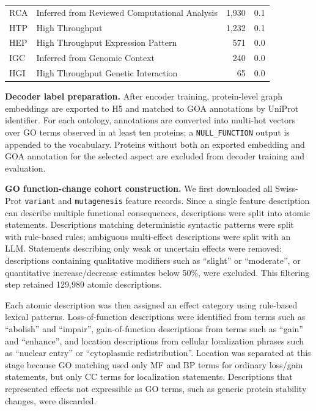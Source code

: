 \documentclass[11pt,a4paper]{article}
\begin{document}
\begin{table}[H]
\begin{tabular}{@{}llrr@{}}
RCA & Inferred from Reviewed Computational Analysis   &   1{,}930 &  0.1 \\
HTP & High Throughput                                 &   1{,}232 &  0.1 \\
HEP & High Throughput Expression Pattern              &     571 &  0.0 \\
IGC & Inferred from Genomic Context                   &     240 &  0.0 \\
HGI & High Throughput Genetic Interaction              &      65 &  0.0 \\
\bottomrule
\end{tabular}
\end{table}

\textbf{Decoder label preparation.} After encoder training, protein-level graph embeddings are exported to H5 and matched to GOA annotations by UniProt identifier. For each ontology, annotations are converted into multi-hot vectors over GO terms observed in at least ten proteins; a \texttt{NULL\_FUNCTION} output is appended to the vocabulary. Proteins without both an exported embedding and GOA annotation for the selected aspect are excluded from decoder training and evaluation.

\textbf{GO function-change cohort construction.} We first downloaded all Swiss-Prot \texttt{variant} and \texttt{mutagenesis} feature records. Since a single feature description can describe multiple functional consequences, descriptions were split into atomic statements. Descriptions matching deterministic syntactic patterns were split with rule-based rules; ambiguous multi-effect descriptions were split with an LLM. Statements describing only weak or uncertain effects were removed: descriptions containing qualitative modifiers such as ``slight'' or ``moderate'', or quantitative increase/decrease estimates below 50\%, were excluded. This filtering step retained 129,989 atomic descriptions.

Each atomic description was then assigned an effect category using rule-based lexical patterns. Loss-of-function descriptions were identified from terms such as ``abolish'' and ``impair'', gain-of-function descriptions from terms such as ``gain'' and ``enhance'', and location descriptions from cellular localization phrases such as ``nuclear entry'' or ``cytoplasmic redistribution''. Location was separated at this stage because GO matching used only MF and BP terms for ordinary loss/gain statements, but only CC terms for localization statements. Descriptions that represented effects not expressible as GO terms, such as generic protein stability changes, were discarded.
\end{document}
